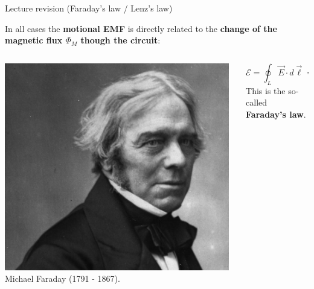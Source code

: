 \begin{frame}{Lecture \summarizedlecture revision (Faraday's law / Lenz's law)}

In all cases the {\bf motional EMF} is directly related
to the {\bf change of the magnetic flux $\Phi_{M}$ though the circuit}:\\

\vspace{0.1cm}

\begin{columns} [T]
  \begin{column}{0.25\textwidth}
    \includegraphics[width=0.98\textwidth]{./images/people/faraday.png}\\
    {\tiny Michael Faraday (1791 - 1867).}
  \end{column}
  \begin{column}{0.75\textwidth}
   \begin{center}
    \begin{equation*}
      \mathcal{E} = \oint_{L} \vec{E} \cdot d\vec{\ell} = - \frac{d\Phi_{M}}{dt}
    \end{equation*}
    \vspace{0.2cm}
    This is the so-called {\bf Faraday's law}.
   \end{center}
  \end{column}
\end{columns}

\vspace{0.1cm}


\end{frame}
